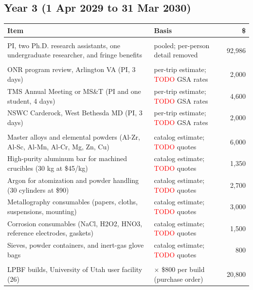 \subsection*{Year 3 (1 Apr 2029 to 31 Mar 2030)}
\begin{longtable}{@{}>{\raggedright\arraybackslash}p{2.6in}>{\raggedright\arraybackslash}p{2.75in}r@{}}
\toprule \textbf{Item} & \textbf{Basis} & \textbf{\$} \\ \midrule \endhead
\multicolumn{3}{@{}l}{\textit{A--C. Personnel and fringe benefits (pooled)}} \\
PI, two Ph.D. research assistants, one undergraduate researcher, and fringe benefits & pooled; per-person detail removed & 92,986 \\
%
%
%
%
%
%
\multicolumn{3}{@{}l}{\textit{E. Travel}} \\
ONR program review, Arlington VA (PI, 3 days) & per-trip estimate; \textcolor{red}{TODO} GSA rates & 2,000 \\
TMS Annual Meeting or MS\&T (PI and one student, 4 days) & per-trip estimate; \textcolor{red}{TODO} GSA rates & 4,600 \\
NSWC Carderock, West Bethesda MD (PI, 3 days) & per-trip estimate; \textcolor{red}{TODO} GSA rates & 2,000 \\
\multicolumn{3}{@{}l}{\textit{F. Materials and supplies}} \\
Master alloys and elemental powders (Al-Zr, Al-Sc, Al-Mn, Al-Cr, Mg, Zn, Cu) & catalog estimate; \textcolor{red}{TODO} quotes & 6,000 \\
High-purity aluminum bar for machined crucibles (30 kg at \$45/kg) & catalog estimate; \textcolor{red}{TODO} quotes & 1,350 \\
Argon for atomization and powder handling (30 cylinders at \$90) & catalog estimate; \textcolor{red}{TODO} quotes & 2,700 \\
Metallography consumables (papers, cloths, suspensions, mounting) & catalog estimate; \textcolor{red}{TODO} quotes & 3,000 \\
Corrosion consumables (NaCl, H2O2, HNO3, reference electrodes, gaskets) & catalog estimate; \textcolor{red}{TODO} quotes & 1,500 \\
Sieves, powder containers, and inert-gas glove bags & catalog estimate; \textcolor{red}{TODO} quotes & 800 \\
\multicolumn{3}{@{}l}{\textit{G. Other direct costs}} \\
LPBF builds, University of Utah user facility (26) & 26 $\times$ \$800 per build (purchase order) & 20,800 \\

\end{longtable}
